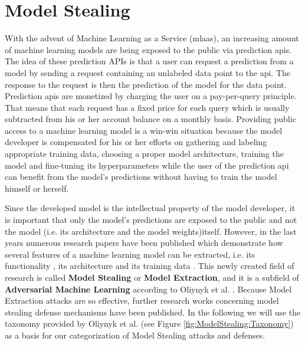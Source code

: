 \section{Model Stealing}
\label{sec:ModelStealing}
With the advent of Machine Learning as a Service (\gls{mlaas}), an increasing amount of machine learning models are being exposed to the public via 
prediction \glspl{api}. The idea of these prediction APIs is that a user can request a prediction from a model by sending a request containing an unlabeled data
point to the \gls{api}. The response to the request is then the prediction of the model for the data point. Prediction \glspl{api} are monetized by charging the user
on a pay-per-query principle. That means that each request has a fixed price for each query which is usually subtracted from his or her account balance on
a monthly basis. Providing public access to a machine learning model is a win-win situation because the model developer is compensated for his or her efforts
on gathering and labeling appropriate training data, choosing a proper model architecture, training the model and fine-tuning its hyperparameters while the user
of the prediction \gls{api} can benefit from the model's predictions without having to train the model himself or herself. \par
Since the developed model is the intellectual property of the model developer, it is important that only the model's predictions are exposed to the public and
not the model (i.e. its architecture and the model weights)itself. However, in the last years numerous research papers have been published which demonstrate how
several features of a machine learning model can be extracted, i.e. its functionality \cite{tramer2016stealing}, its architecture \cite{oh2019towards} and its
training data \cite{shokri2017membership}. This newly created field of research is called \textbf{Model Stealing} or \textbf{Model Extraction}, and it is a subfield
of \textbf{Adversarial Machine Learning} according to Oliynyk et al. \cite{oliynyk2022know}. Because Model Extraction attacks are so effective, further research works
concerning model stealing defense mechanisms have been published. In the following we will use the taxonomy provided by Oliynyk et al. (see Figure 
\ref{fig:ModelStealing:Taxonomy}) \cite{oliynyk2022know} as a basis for our categorization of Model Stealing attacks and defenses.

